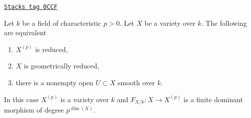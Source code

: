 \begin{lemma}
\label{varieties-lemma-inseparable-deg-p-smooth}
\href{https://stacks.math.columbia.edu/tag/0CCF}{\texttt{Stacks tag 0CCF}}

Let $k$ be a field of characteristic $p > 0$. Let $X$ be a variety over $k$.
The following are equivalent
\begin{enumerate}
\item $X^{(p)}$ is reduced,
\item $X$ is geometrically reduced,
\item there is a nonempty open $U \subset X$ smooth over $k$.
\end{enumerate}
In this case $X^{(p)}$ is a variety over $k$ and $F_{X/k} : X \to X^{(p)}$
is a finite dominant morphism of degree $p^{\dim(X)}$.
\end{lemma}

